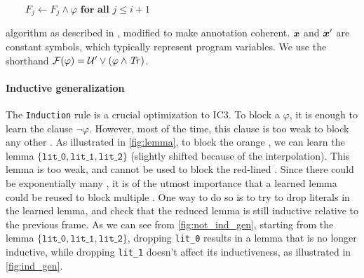 \begin{algorithm2e}[t]
{{{        $\qquad F_{j} \gets F_{j} \land \varphi \textbf{ for all } j
        \leq i + 1$}

       

       

       

       \lGuard {\isSat($\Bad \land \cU$)}{

        \qquad \Return \unsafe}
    }
  }
  \caption{\spc algorithm as described in \cite{GSpacer}, modified to make
    annotation coherent. $\boldsymbol{x}$ and $\boldsymbol{x}'$ are constant symbols, which
    typically represent program variables. We use the shorthand $\mathcal{F}(\varphi) = \mathcal{U}' \lor (\varphi \land \mathit{Tr})$.}
  \label{alg:spc}
\end{algorithm2e}

\paragraph{Inductive generalization}
The \texttt{Induction} rule is a crucial optimization to IC3. To block a \pob
$\varphi$, it is enough to learn the clause $\lnot \varphi$. However, most of the
time, this clause is too weak to block any other \pob. As illustrated in
\cref{fig:lemma}, to block the orange \pob, we can learn the lemma
$\{\texttt{lit\_0}, \texttt{lit\_1}, \texttt{lit\_2}\}$ (slightly shifted because of the interpolation). This
lemma is too weak, and cannot be used to block the red-lined \pob. Since there
could be exponentially many \pobs, it is of the utmost importance that a learned
lemma could be reused to block multiple \pobs. One way to do so is to try to
drop literals in the learned lemma, and check that the reduced lemma is still
inductive relative to the previous frame.
As we can see from \cref{fig:not_ind_gen}, starting from the lemma $\{\texttt{lit\_0}, \texttt{lit\_1}, \texttt{lit\_2}\}$, dropping \texttt{lit\_0} results in a lemma that is no longer inductive, while dropping \texttt{lit\_1} doesn't affect its inductiveness, as illustrated in \cref{fig:ind_gen}.


